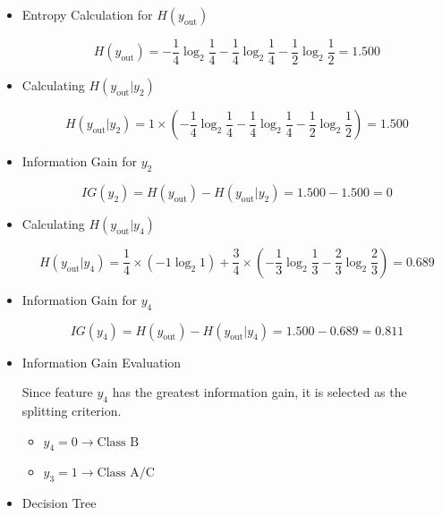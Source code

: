 \documentclass[12pt]{article}
\begin{document}
\begin{enumerate}[leftmargin=\labelsep, label=\textbf{\arabic*.)}]
\begin{itemize}
              \item Entropy Calculation for \( H(y_{\text{out}}) \)

                    \[
                        H(y_{\text{out}}) = -\frac{1}{4} \log_2 \frac{1}{4} - \frac{1}{4} \log_2 \frac{1}{4} - \frac{1}{2} \log_2 \frac{1}{2} = 1.500
                    \]

              \item Calculating \( H(y_{\text{out}}|y_2) \)

                    \[
                        H(y_{\text{out}}|y_2) = 1 \times \left( -\frac{1}{4} \log_2 \frac{1}{4} -\frac{1}{4} \log_2 \frac{1}{4} -\frac{1}{2} \log_2 \frac{1}{2}\right) = 1.500
                    \]

              \item Information Gain for \( y_2 \)

                    \[
                        IG(y_2) = H(y_{\text{out}}) - H(y_{\text{out}}|y_2) = 1.500 - 1.500 = 0
                    \]

              \item Calculating \( H(y_{\text{out}}|y_4) \)

                    \[
                        H(y_{\text{out}}|y_4) = \frac{1}{4} \times \left( - 1 \log_2 1 \right) + \frac{3}{4} \times \left( -\frac{1}{3} \log_2 \frac{1}{3} - \frac{2}{3} \log_2 \frac{2}{3} \right) = 0.689
                    \]

              \item Information Gain for \( y_4 \)

                    \[
                        IG(y_4) = H(y_{\text{out}}) - H(y_{\text{out}}|y_4) = 1.500 - 0.689 = 0.811
                    \]

              \item Information Gain Evaluation

                    Since feature \( y_4 \) has the greatest information gain, it is selected as the splitting criterion.

                    \begin{itemize}
                        \item \( y_4 = 0 \rightarrow \text{Class B} \)
                        \item \( y_3 = 1 \rightarrow \text{Class A/C} \)
                    \end{itemize}

              \item Decision Tree


\end{itemize}
\end{enumerate}
\end{document}
